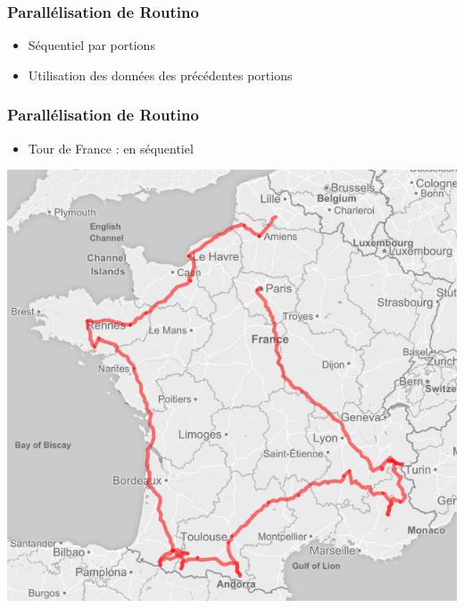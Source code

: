 
\begin{frame}
  \frametitle{Parallélisation de Routino}
  \begin{itemize}
  \item Séquentiel par portions
    \vspace{1em}
  \item Utilisation des données des précédentes portions
  \end{itemize}
\end{frame}


\begin{frame}
  \frametitle{Parallélisation de Routino}

  \begin{itemize}
  \item Tour de France : en séquentiel
  \end{itemize}

  \begin{center}
    \includegraphics[scale=0.33]{include/tourfrance_mono.png}
  \end{center}

\end{frame}


